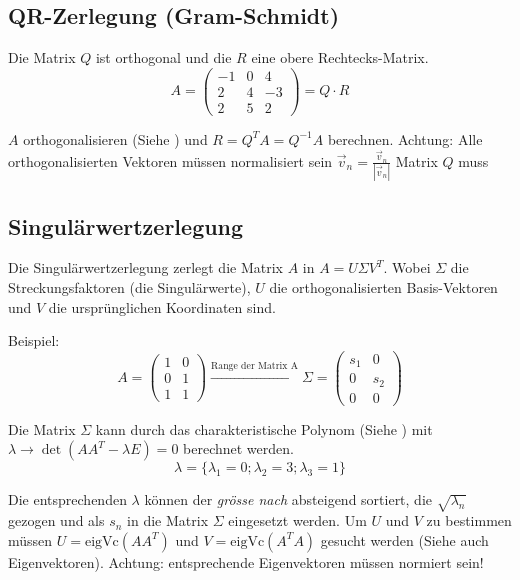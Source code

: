 \subsection{QR-Zerlegung (Gram-Schmidt)}
Die Matrix $Q$ ist orthogonal und die $R$ eine obere Rechtecks-Matrix.
\[A = \begin{pmatrix}
	-1 & 0 & 4 \\
	2 & 4 & -3 \\
	2 & 5 & 2
\end{pmatrix} = Q \cdot R \]

\noindent $A$ orthogonalisieren (Siehe ) und $R = Q^{T}A = Q^{-1}A$ berechnen. Achtung: Alle orthogonalisierten Vektoren müssen normalisiert sein $\vec{v}_n = \frac{\vec{v}_n}{|\vec{v}_n|}$ Matrix $Q$ muss 


\subsection{Singulärwertzerlegung}
Die Singulärwertzerlegung zerlegt die Matrix $A$ in $A = U\Sigma V^T$. Wobei $\Sigma$ die Streckungsfaktoren (die Singulärwerte), $U$ die orthogonalisierten Basis-Vektoren und $V$ die ursprünglichen Koordinaten sind.

Beispiel:
\[A = \begin{pmatrix}
	1 & 0 \\
	0 & 1 \\
	1 & 1
\end{pmatrix}
\xrightarrow{\text{Range der Matrix A}}
\Sigma = \begin{pmatrix}
	s_1 & 0 \\
	0 & s_2 \\
	0 & 0
\end{pmatrix}
\]

\noindent Die Matrix $\Sigma$ kann durch das charakteristische Polynom (Siehe ) mit $\lambda \rightarrow \det(AA^T - \lambda E) = 0$ berechnet werden. \[\lambda = \{\lambda_1 = 0; \lambda_2 = 3; \lambda_3 = 1\}\]

\noindent Die entsprechenden $\lambda$ können der \textit{grösse nach} absteigend sortiert, die $\sqrt{\lambda_n}$ gezogen und als $s_n$ in die Matrix $\Sigma$ eingesetzt werden. Um $U$ und $V$ zu bestimmen müssen $U = \text{eigVc}(AA^T)$ und $V = \text{eigVc}(A^TA)$ gesucht werden (Siehe auch Eigenvektoren). Achtung: entsprechende Eigenvektoren müssen normiert sein!

